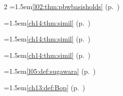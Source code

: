 \begin{multicols}{2}
\hangindent=1.5em\quad \ref{l02:thm:pbwbasisholds} (p.~\pageref{l02:thm:pbwbasisholds})\par
\par{}\par\nopagebreak\smallskip
\hangindent=1.5em\quad \ref{ch14:thm:simil} (p.~\pageref{ch14:thm:simil})\par
\hangindent=1.5em\quad \ref{ch14:thm:simil} (p.~\pageref{ch14:thm:simil})\par
\hangindent=1.5em\quad \ref{ch14:thm:simil} (p.~\pageref{ch14:thm:simil})\par
\par{}\par\nopagebreak\smallskip
\hangindent=1.5em\quad \ref{l05:def:sugawara} (p.~\pageref{l05:def:sugawara})\par
\hangindent=1.5em\quad \ref{ch13:def:Bop} (p.~\pageref{ch13:def:Bop})\par
\end{multicols}\endgroup
